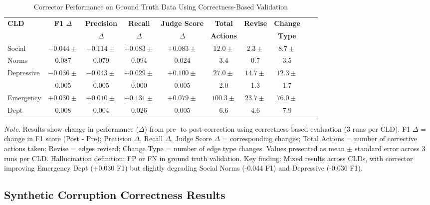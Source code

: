 \begin{table}[H]
\centering
\caption{Corrector Performance on Ground Truth Data Using Correctness-Based Validation}
\label{tab:rq1b_groundtruth_correctness}
\begin{threeparttable}
\begin{tabular}{lccccccccc}
\toprule
\textbf{CLD} & \textbf{F1 $\Delta$} & \textbf{Precision} & \textbf{Recall} & \textbf{Judge Score} & \textbf{Total} & \textbf{Revise} & \textbf{Change} \\
 & & \textbf{$\Delta$} & \textbf{$\Delta$} & \textbf{$\Delta$} & \textbf{Actions} & & \textbf{Type} \\
\midrule
Social        & $-0.044 \pm$ & $-0.114 \pm$ & $+0.083 \pm$ & $+0.083 \pm$ & $12.0 \pm$ & $2.3 \pm$ & $8.7 \pm$ \\
Norms         & 0.087 & 0.079 & 0.094 & 0.024 & 3.4 & 0.7 & 3.5 \\
\midrule
Depressive    & $-0.036 \pm$ & $-0.043 \pm$ & $+0.029 \pm$ & $+0.100 \pm$ & $27.0 \pm$ & $14.7 \pm$ & $12.3 \pm$ \\
              & 0.005 & 0.005 & 0.000 & 0.005 & 2.0 & 1.3 & 1.7 \\
\midrule
Emergency     & $+0.030 \pm$ & $+0.010 \pm$ & $+0.131 \pm$ & $+0.079 \pm$ & $100.3 \pm$ & $23.7 \pm$ & $76.0 \pm$ \\
Dept          & 0.008 & 0.004 & 0.026 & 0.005 & 6.6 & 4.6 & 7.9 \\
\bottomrule
\end{tabular}
\begin{tablenotes}
\small
\item \textit{Note.} Results show change in performance ($\Delta$) from pre- to post-correction using correctness-based evaluation (3 runs per CLD). 
F1 $\Delta$ = change in F1 score (Post - Pre); Precision $\Delta$, Recall $\Delta$, Judge Score $\Delta$ = corresponding changes; 
Total Actions = number of corrective actions taken; Revise = edges revised; Change Type = number of edge type changes. 
Values presented as mean $\pm$ standard error across 3 runs per CLD. 
Hallucination definition: FP or FN in ground truth validation. 
Key finding: Mixed results across CLDs, with corrector improving Emergency Dept (+0.030 F1) but slightly degrading Social Norms (-0.044 F1) and Depressive (-0.036 F1).
\end{tablenotes}
\end{threeparttable}
\end{table}

\subsection{Synthetic Corruption Correctness Results}

